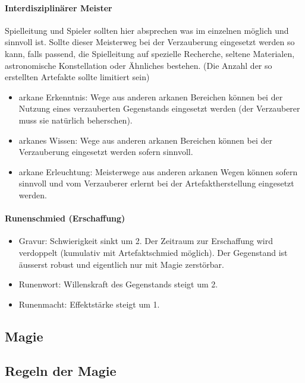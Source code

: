 \documentclass{article}
\begin{document}
\paragraph{Interdisziplinärer Meister}

Spielleitung und Spieler sollten hier absprechen was im einzelnen möglich und sinnvoll ist. Sollte dieser Meisterweg
bei der Verzauberung eingesetzt werden so kann, falls passend, die Spielleitung auf spezielle Recherche, seltene
Materialen, astronomische Konstellation oder Ähnliches bestehen. (Die Anzahl der so erstellten Artefakte sollte
limitiert sein)

\begin{itemize}
\item arkane Erkenntnis: Wege aus anderen arkanen Bereichen können bei der Nutzung eines verzauberten Gegenstands eingesetzt werden (der Verzauberer muss sie natürlich beherschen).
\item arkanes Wissen: Wege aus anderen arkanen Bereichen können bei der Verzauberung eingesetzt werden sofern sinnvoll.
\item arkane Erleuchtung: Meisterwege aus anderen arkanen Wegen können sofern sinnvoll und vom Verzauberer erlernt bei der Artefaktherstellung eingesetzt werden.
\end{itemize}

\paragraph{Runenschmied (Erschaffung)}

\begin{itemize}
\item Gravur: Schwierigkeit sinkt um 2. Der Zeitraum zur Erschaffung wird verdoppelt (kumulativ mit Artefaktschmied möglich). Der Gegenstand ist äusserst robust und eigentlich nur mit Magie zerstörbar.
\item Runenwort: Willenskraft des Gegenstands steigt um 2.
\item Runenmacht: Effektstärke steigt um 1.
\end{itemize}

\begin{center}
\section{Magie}
\end{center}

\begin{center}
\subsection{Regeln der Magie}
\end{center}
\end{document}
